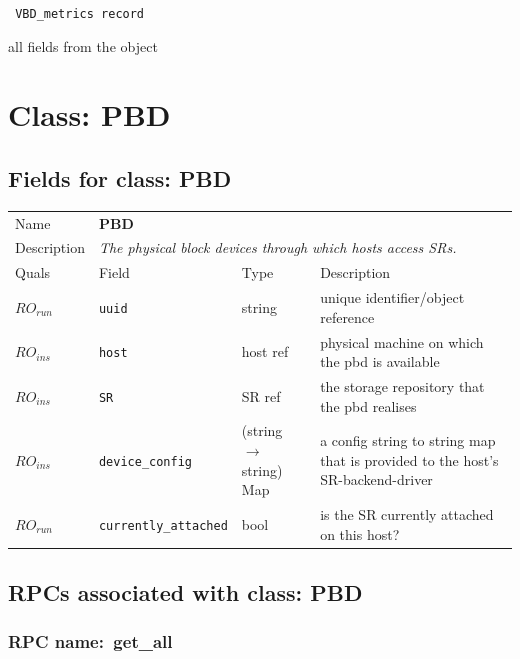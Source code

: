 \vspace{0.3cm}

{\tt 
VBD\_metrics record
}


all fields from the object
\vspace{0.3cm}
\vspace{0.3cm}
\vspace{0.3cm}

\vspace{1cm}
\newpage
\section{Class: PBD}
\subsection{Fields for class: PBD}
\begin{longtable}{|lllp{}|}
\hline
\multicolumn{1}{|l}{Name} & \multicolumn{3}{l|}{\bf PBD} \\
\multicolumn{1}{|l}{Description} & \multicolumn{3}{l|}{\parbox{11cm}{\em
The physical block devices through which hosts access SRs.}} \\
\hline
Quals & Field & Type & Description \\
\hline
$\mathit{RO}_\mathit{run}$ &  {\tt uuid} & string & unique identifier/object reference \\
$\mathit{RO}_\mathit{ins}$ &  {\tt host} & host ref & physical machine on which the pbd is available \\
$\mathit{RO}_\mathit{ins}$ &  {\tt SR} & SR ref & the storage repository that the pbd realises \\
$\mathit{RO}_\mathit{ins}$ &  {\tt device\_config} & (string $\rightarrow$ string) Map & a config string to string map that is provided to the host's SR-backend-driver \\
$\mathit{RO}_\mathit{run}$ &  {\tt currently\_attached} & bool & is the SR currently attached on this host? \\
\hline
\end{longtable}
\subsection{RPCs associated with class: PBD}
\subsubsection{RPC name:~get\_all}

